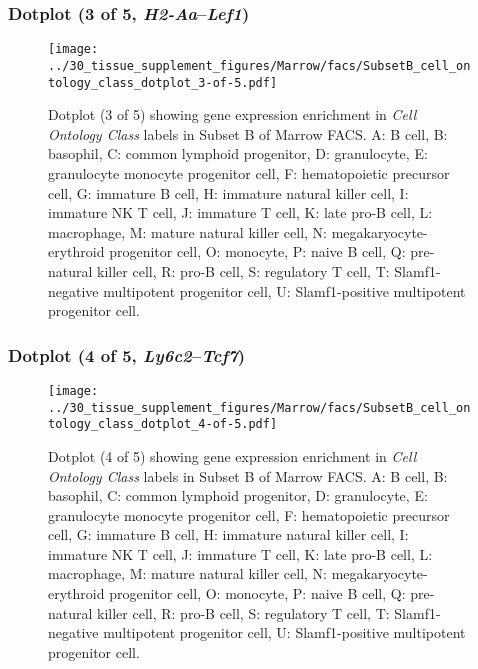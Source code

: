 \subsubsection{Dotplot (3 of 5, \emph{H2-Aa}--\emph{Lef1})}
\begin{figure}[h]
\centering
\texttt{[image: ../30\_tissue\_supplement\_figures/Marrow/facs/SubsetB\_cell\_ontology\_class\_dotplot\_3-of-5.pdf]}

\caption{ Dotplot (3 of 5)  showing gene expression enrichment in \emph{Cell Ontology Class} labels in Subset B of Marrow FACS. A: B cell, B: basophil, C: common lymphoid progenitor, D: granulocyte, E: granulocyte monocyte progenitor cell, F: hematopoietic precursor cell, G: immature B cell, H: immature natural killer cell, I: immature NK T cell, J: immature T cell, K: late pro-B cell, L: macrophage, M: mature natural killer cell, N: megakaryocyte-erythroid progenitor cell, O: monocyte, P: naive B cell, Q: pre-natural killer cell, R: pro-B cell, S: regulatory T cell, T: Slamf1-negative multipotent progenitor cell, U: Slamf1-positive multipotent progenitor cell.}
\end{figure}


\clearpage

\subsubsection{Dotplot (4 of 5, \emph{Ly6c2}--\emph{Tcf7})}
\begin{figure}[h]
\centering
\texttt{[image: ../30\_tissue\_supplement\_figures/Marrow/facs/SubsetB\_cell\_ontology\_class\_dotplot\_4-of-5.pdf]}

\caption{ Dotplot (4 of 5)  showing gene expression enrichment in \emph{Cell Ontology Class} labels in Subset B of Marrow FACS. A: B cell, B: basophil, C: common lymphoid progenitor, D: granulocyte, E: granulocyte monocyte progenitor cell, F: hematopoietic precursor cell, G: immature B cell, H: immature natural killer cell, I: immature NK T cell, J: immature T cell, K: late pro-B cell, L: macrophage, M: mature natural killer cell, N: megakaryocyte-erythroid progenitor cell, O: monocyte, P: naive B cell, Q: pre-natural killer cell, R: pro-B cell, S: regulatory T cell, T: Slamf1-negative multipotent progenitor cell, U: Slamf1-positive multipotent progenitor cell.}
\end{figure}


\clearpage

